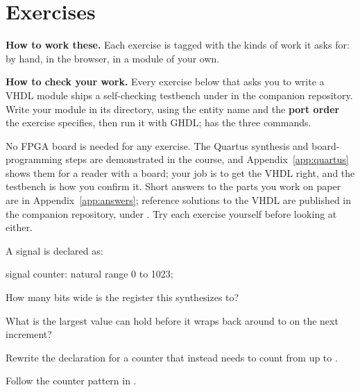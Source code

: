 
\section{Exercises}
\label{c6:sec:exercises}

\begin{aside}
\textbf{How to work these.} Each exercise is tagged with the kinds of work it asks for:
 by hand,  in the browser,  in a module of your own.

\textbf{How to check your work.} Every exercise below that asks you to write a VHDL module ships a
self-checking testbench under  in the companion repository. Write your
module in its  directory, using the entity name and the \textbf{port
order} the exercise specifies, then run it with GHDL;  has the three commands.

No FPGA board is needed for any exercise. The Quartus synthesis and board-programming steps are
demonstrated in the course, and Appendix~\ref{app:quartus} shows them for a reader with a board;
your job is to get the VHDL right, and the testbench is how you confirm it. Short answers to the
parts you work on paper are in Appendix~\ref{app:answers}; reference solutions to the VHDL are
published in the companion repository, under . Try each exercise
yourself before looking at either.
\end{aside}

\label{c6:set:1}

\label{c6:ex:1}
A signal is declared as:

\begin{vhdlcode}
signal counter: natural range 0 to 1023;
\end{vhdlcode}

\begin{parts}
  \item How many bits wide is the register this synthesizes to?
  \item What is the largest value  can hold before it wraps back around to 
    on the next increment?
  \item Rewrite the declaration for a counter that instead needs to count from  up to
    .
\end{parts}
Follow the counter pattern in .

